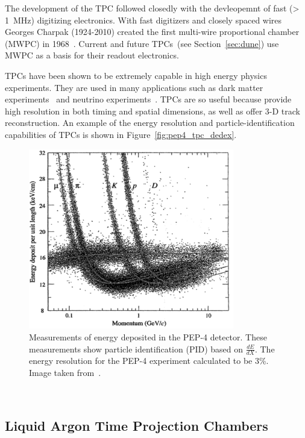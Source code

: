 The development of the TPC followed closedly with the devleopemnt of fast (> 1~\unit{MHz}) digitizing electronics.
With fast digitizers and closely spaced wires Georges Charpak (1924-2010) created the first multi-wire proportional chamber (MWPC) in 1968~\citep{Charpak:1968kd}.
Current and future TPCs~(see Section~\ref{sec:dune}) use MWPC as a basis for their readout electronics.

TPCs have been shown to be extremely capable in high energy physics experiments.
They are used in many applications such as dark matter experiments~\citep{Aprile_2017_xenon1T} and neutrino experiments~\citep{MicroBooNE_Acciarri_2017}.
TPCs are so useful because provide high resolution in both timing and spatial dimensions, as well as offer 3-D track reconstruction.
An example of the energy resolution and particle-identification capabilities of TPCs is shown in Figure~\ref{fig:pep4_tpc_dedex}.

\begin{figure}[]
\centering
\includegraphics[width=0.8\textwidth]{images/pep4_tpc_dEdx.png}
\caption{Measurements of energy deposited in the PEP-4 detector.
These measurements show particle identification (PID) based on $\frac{dE}{dX}$.
The energy resolution for the PEP-4 experiment calculated to be 3\%.
Image taken from~\citep{pep_image}.
}
\end{figure}
~\label{fig:pep4_tpc_dedex}

\subsection{Liquid Argon Time Projection Chambers}~\label{sec:lartpcs}

